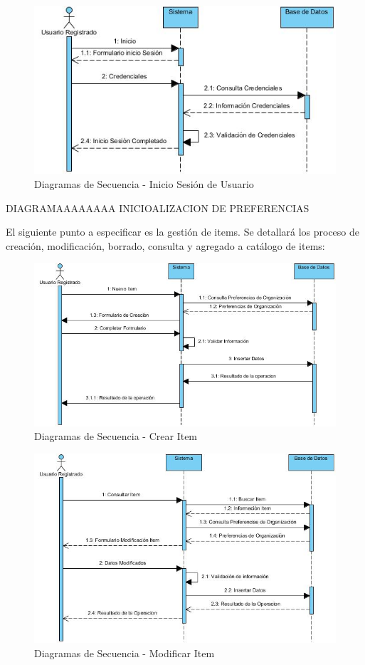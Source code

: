 \documentclass[a4paper,11pt]{book}
\begin{document}
\begin{figure}[H] 
\centering 
\includegraphics[scale=0.50]{imagenes/secuencia/Inicio_Sesion.jpg}
\caption{ Diagramas de Secuencia - Inicio Sesión de Usuario\cite{diagrama}  }  
\end{figure}

DIAGRAMAAAAAAAA INICIOALIZACION DE PREFERENCIAS 

El siguiente punto a especificar es la gestión de items. Se detallará los proceso de creación, modificación, borrado, consulta y agregado a catálogo de items:

\begin{figure}[H] 
\centering 
\includegraphics[scale=0.50]{imagenes/secuencia/Crear_Item.jpg}
\caption{ Diagramas de Secuencia - Crear Item\cite{diagrama}  }  
\end{figure}

\begin{figure}[H] 
\centering 
\includegraphics[scale=0.50]{imagenes/secuencia/Modificar_Item.jpg}
\caption{ Diagramas de Secuencia - Modificar Item\cite{diagrama}  }  
\end{figure}
\end{document}
